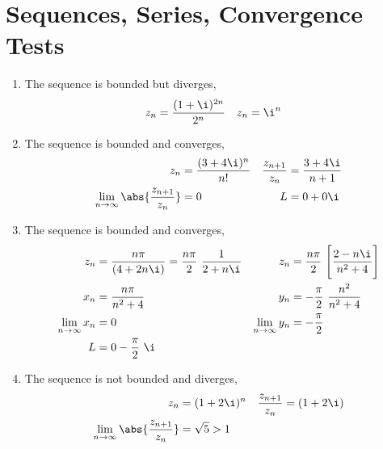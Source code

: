 \section{Sequences, Series, Convergence Tests}

\begin{enumerate}
    \item The sequence is bounded but \textcolor{y_p}{diverges},
          \begin{align}
              z_n & = \frac{(1+\i)^{2n}}{2^n} &
              z_n & = \i^n
          \end{align}

    \item The sequence is bounded and \textcolor{y_h}{converges},
          \begin{align}
              z_n                       & = \frac{(3+4\i)^{n}}{n!} &
              \frac{z_{n+1}}{z_n}       & = \frac{3+ 4\i}{n+1}       \\
              \lim_{n \to \infty}
              \abs{\frac{z_{n+1}}{z_n}} & = 0                      &
              L                         & = 0 + 0\i
          \end{align}

    \item The sequence is bounded and \textcolor{y_h}{converges},
          \begin{align}
              z_n                                 & = \frac{n\pi}{(4 + 2n\i)}
              = \frac{n\pi}{2}\ \frac{1}{2 + n\i} &
              z_n                                 & = \frac{n\pi}{2}\ \Bigg[
              \frac{2 - n\i}{n^2 + 4}\Bigg]                                        \\
              x_n                                 & = \frac{n\pi}{n^2 + 4}       &
              y_n                                 & = -\frac{\pi}{2}\ \frac{n^2}
              {n^2 + 4}                                                            \\
              \lim_{n \to \infty} x_n             & = 0                          &
              \lim_{n \to \infty} y_n             & = -\frac{\pi}{2}               \\
              L                                   & = 0 - \frac{\pi}{2}\ \i
          \end{align}

    \item The sequence is not bounded and \textcolor{y_p}{diverges},
          \begin{align}
              z_n                       & = (1 + 2\i)^n  &
              \frac{z_{n+1}}{z_n}       & = (1 + 2\i)      \\
              \lim_{n \to \infty}
              \abs{\frac{z_{n+1}}{z_n}} & = \sqrt{5} > 1
          \end{align}


\end{enumerate}
